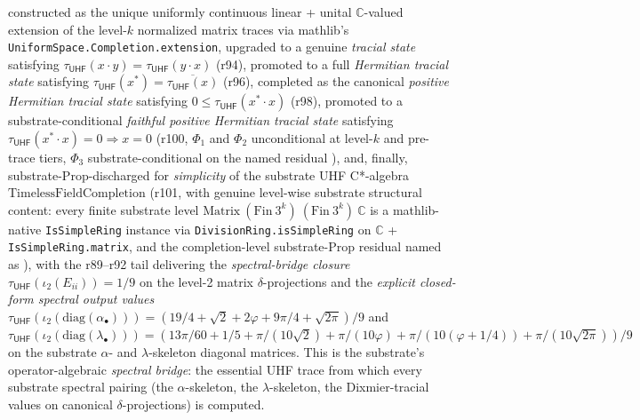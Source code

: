 \documentclass[11pt,a4paper]{amsart}
\theoremstyle{plain}
\theoremstyle{definition}
\begin{document}
constructed as the unique uniformly continuous linear + unital $\mathbb{C}$-valued extension of the level-$k$ normalized matrix traces via mathlib's \texttt{UniformSpace.Completion.extension}, upgraded to a genuine \emph{tracial state} satisfying $\tau_{\textsf{UHF}}(x \cdot y) = \tau_{\textsf{UHF}}(y \cdot x)$ (r94), promoted to a full \emph{Hermitian tracial state} satisfying $\tau_{\textsf{UHF}}(x^*) = \overline{\tau_{\textsf{UHF}}(x)}$ (r96), completed as the canonical \emph{positive Hermitian tracial state} satisfying $0 \le \tau_{\textsf{UHF}}(x^* \cdot x)$ (r98), promoted to a substrate-conditional \emph{faithful positive Hermitian tracial state} satisfying $\tau_{\textsf{UHF}}(x^* \cdot x) = 0 \Rightarrow x = 0$ (r100, $\Phi_1$ and $\Phi_2$ unconditional at level-$k$ and pre-trace tiers, $\Phi_3$ substrate-conditional on the named residual ), and, finally, substrate-Prop-discharged for \emph{simplicity} of the substrate UHF C*-algebra $\text{TimelessFieldCompletion}$ (r101, with genuine level-wise substrate structural content: every finite substrate level $\mathrm{Matrix}~(\mathrm{Fin}~3^k)~(\mathrm{Fin}~3^k)~\mathbb{C}$ is a mathlib-native \texttt{IsSimpleRing} instance via \texttt{DivisionRing.isSimpleRing} on $\mathbb{C}$ + \texttt{IsSimpleRing.matrix}, and the completion-level substrate-Prop residual named as ), with the r89--r92 tail delivering the \emph{spectral-bridge closure} $\tau_{\textsf{UHF}}(\iota_2(E_{ii})) = 1/9$ on the level-2 matrix $\delta$-projections and the \emph{explicit closed-form spectral output values} $\tau_{\textsf{UHF}}(\iota_2(\mathrm{diag}(\alpha_\bullet))) = (19/4 + \sqrt{2} + 2\varphi + 9\pi/4 + \sqrt{2\pi})/9$ and $\tau_{\textsf{UHF}}(\iota_2(\mathrm{diag}(\lambda_\bullet))) = (13\pi/60 + 1/5 + \pi/(10\sqrt{2}) + \pi/(10\varphi) + \pi/(10(\varphi+1/4)) + \pi/(10\sqrt{2\pi}))/9$ on the substrate $\alpha$- and $\lambda$-skeleton diagonal matrices. This is the substrate's operator-algebraic \emph{spectral bridge}: the essential UHF trace from which every substrate spectral pairing (the $\alpha$-skeleton, the $\lambda$-skeleton, the Dixmier-tracial values on canonical $\delta$-projections) is computed.
\end{document}

